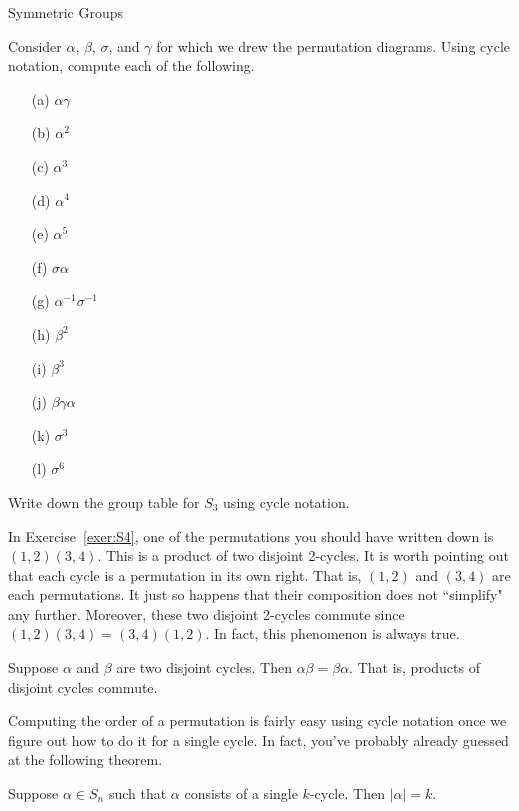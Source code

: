 \begin{section}{Symmetric Groups}
\begin{exercise}
Consider \(\alpha\), \(\beta\), \(\sigma\), and \(\gamma\) for which we drew the permutation diagrams.  Using cycle notation, compute each of the following.
\begin{multicols}{2}
\begin{enumerate}
\item[(a)] \(\alpha\gamma\)
\item[(b)] \(\alpha^2\)
\item[(c)] \(\alpha^3\)
\item[(d)] \(\alpha^4\)
\item[(e)] \(\alpha^5\)
\item[(f)] \(\sigma\alpha\)
\item[(g)] \(\alpha^{-1}\sigma^{-1}\)
\item[(h)] \(\beta^2\)
\item[(i)] \(\beta^3\)
\item[(j)] \(\beta\gamma\alpha\)
\item[(k)] \(\sigma^3\)
\item[(l)] \(\sigma^6\)
\end{enumerate}
\end{multicols}
\end{exercise}

\begin{exercise}
Write down the group table for \(S_3\) using cycle notation.
\end{exercise}

In Exercise~\ref{exer:S4}, one of the permutations you should have written down is \((1,2)(3,4)\).  This is a product of two disjoint 2-cycles.  It is worth pointing out that each cycle is a permutation in its own right.  That is, \((1,2)\) and \((3,4)\) are each permutations.  It just so happens that their composition does not ``simplify" any further.  Moreover, these two disjoint 2-cycles commute since \((1,2)(3,4)=(3,4)(1,2)\).  In fact, this phenomenon is always true.

\begin{theorem}
Suppose \(\alpha\) and \(\beta\) are two disjoint cycles.  Then \(\alpha\beta=\beta\alpha\).  That is, products of disjoint cycles commute.
\end{theorem}

Computing the order of a permutation is fairly easy using cycle notation once we figure out how to do it for a single cycle.  In fact, you've probably already guessed at the following theorem.

\begin{theorem}
Suppose \(\alpha\in S_n\) such that \(\alpha\) consists of a single \(k\)-cycle.  Then \(|\alpha|=k\).
\end{theorem}


\end{section}
